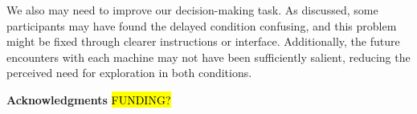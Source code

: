 \documentclass[10pt,letterpaper]{article}
\begin{document}
We also may need to improve our decision-making task. As discussed, some
participants may have found the delayed condition confusing, and this problem
might be fixed through clearer instructions or interface. Additionally, the
future encounters with each machine may not have been sufficiently salient,
reducing the perceived need for exploration in both conditions.


\begin{small}
  \noindent
\textbf{Acknowledgments} 
\hl{FUNDING?}
\end{small}



\end{document}
